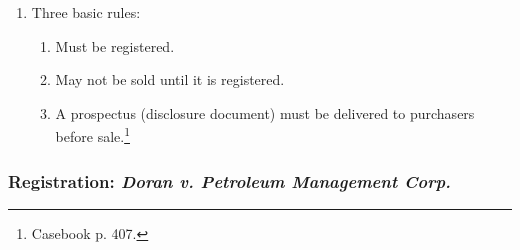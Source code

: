 \begin{enumerate}
    \item Three basic rules:
    \begin{enumerate}
        \item Must be registered.
        \item May not be sold until it is registered.
        \item A prospectus (disclosure document) must be delivered to 
        purchasers before sale.\footnote{Casebook p. 407.}
    \end{enumerate}
\end{enumerate}

\subsubsection{Registration: \emph{Doran v. Petroleum Management Corp.}}

